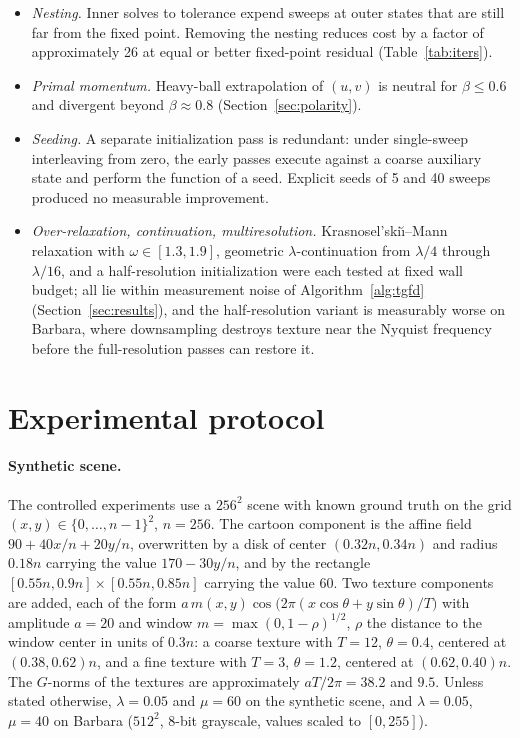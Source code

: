 \documentclass[11pt]{article}
\theoremstyle{definition}
\begin{document}
\begin{itemize}
\item \emph{Nesting.} Inner solves to tolerance expend sweeps at outer
states that are still far from the fixed point. Removing the nesting
reduces cost by a factor of approximately 26 at equal or better fixed-point
residual (Table~\ref{tab:iters}).
\item \emph{Primal momentum.} Heavy-ball extrapolation of $(u,v)$ is
neutral for $\beta\le0.6$ and divergent beyond $\beta\approx0.8$
(Section~\ref{sec:polarity}).
\item \emph{Seeding.} A separate initialization pass is redundant: under
single-sweep interleaving from zero, the early passes execute against a
coarse auxiliary state and perform the function of a seed. Explicit seeds
of 5 and 40 sweeps produced no measurable improvement.
\item \emph{Over-relaxation, continuation, multiresolution.}
Krasnosel'ski\u{\i}--Mann relaxation with $\omega\in[1.3,1.9]$, geometric
$\lambda$-continuation from $\lambda/4$ through $\lambda/16$, and a
half-resolution initialization were each tested at fixed wall budget; all
lie within measurement noise of Algorithm~\ref{alg:tgfd}
(Section~\ref{sec:results}), and the half-resolution variant is measurably
worse on Barbara, where downsampling destroys texture near the Nyquist
frequency before the full-resolution passes can restore it.
\end{itemize}

\section{Experimental protocol}
\label{sec:protocol}

\paragraph{Synthetic scene.}
The controlled experiments use a $256^2$ scene with known ground truth on
the grid $(x,y)\in\{0,\dots,n-1\}^2$, $n=256$. The cartoon component is the
affine field $90+40x/n+20y/n$, overwritten by a disk of center
$(0.32n,0.34n)$ and radius $0.18n$ carrying the value $170-30y/n$, and by
the rectangle $[0.55n,0.9n]\times[0.55n,0.85n]$ carrying the value 60. Two
texture components are added, each of the form
$a\,m(x,y)\cos\!\bigl(2\pi(x\cos\theta+y\sin\theta)/T\bigr)$ with amplitude
$a=20$ and window $m=\max(0,1-\rho)^{1/2}$, $\rho$ the distance to the
window center in units of $0.3n$: a coarse texture with $T=12$,
$\theta=0.4$, centered at $(0.38,0.62)n$, and a fine texture with $T=3$,
$\theta=1.2$, centered at $(0.62,0.40)n$. The $G$-norms of the textures are
approximately $a T/2\pi = 38.2$ and $9.5$. Unless stated otherwise,
$\lambda=0.05$ and $\mu=60$ on the synthetic scene, and $\lambda=0.05$,
$\mu=40$ on Barbara ($512^2$, 8-bit grayscale, values scaled to $[0,255]$).
\end{document}
